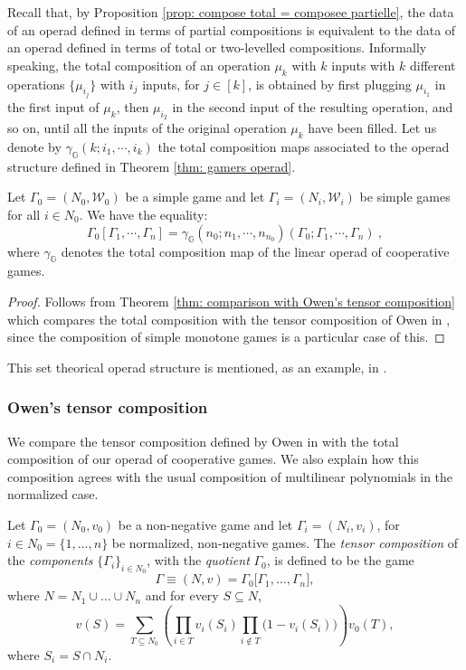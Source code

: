 \documentclass[a4paper,12pt]{amsart}
\begin{document}
\medskip

Recall that, by Proposition \ref{prop: compose total = composee partielle}, the data of an operad defined in terms of partial compositions is equivalent to the data of an operad defined in terms of total or two-levelled compositions. Informally speaking, the total composition of an operation $\mu_k$ with $k$ inputs with $k$ different operations $\{\mu_{i_j}\}$ with $i_j$ inputs, for $j \in [k]$, is obtained by first plugging $\mu_{i_1}$ in the first input of $\mu_k$, then $\mu_{i_2}$ in the second input of the resulting operation, and so on, until all the inputs of the original operation $\mu_k$ have been filled. Let us denote by $\gamma_{\mathbb{G}}(k;i_1,\cdots,i_k)$ the total composition maps associated to the operad structure defined in Theorem \ref{thm: gamers operad}. 

\begin{proposition}
Let $\Gamma_0 = (N_0, \mathcal{W}_0)$ be a simple game and let $\Gamma_i = (N_i, \mathcal{W}_i)$ be simple games for all \(i \in N_0\). We have the equality:
\[
\Gamma_0[\Gamma_1, \cdots, \Gamma_n] = \gamma_{\mathbb{G}}(n_0;n_1,\cdots,n_{n_0})(\Gamma_0;\Gamma_1,\cdots,\Gamma_n)~,
\]
where $\gamma_{\mathbb{G}}$ denotes the total composition map of the linear operad of cooperative games. 
\end{proposition}

\begin{proof}
Follows from Theorem \ref{thm: comparison with Owen's tensor composition} which compares the total composition with the tensor composition of Owen in \cite[pp. 308-309]{OwenTensor}, since the composition of simple monotone games is a particular case of this. 
\end{proof}

\begin{remark}
This set theorical operad structure is mentioned, as an example, in \cite[Section 4.4.2]{Mendez15}. 
\end{remark}

\subsubsection{Owen's tensor composition} We compare the tensor composition defined by Owen in \cite{OwenTensor} with the total composition of our operad of cooperative games. We also explain how this composition agrees with the usual composition of multilinear polynomials in the normalized case. 

\begin{definition}\label{def: tensor composition}
Let $\Gamma_0 = (N_0, v_0)$ be a non-negative game and let $\Gamma_i = (N_i, v_i)$, for $i \in N_0 = \{1, \ldots, n\}$ be normalized, non-negative games. The \emph{tensor composition} of the \emph{components} $\{\Gamma_i\}_{i \in N_0}$, with the \emph{quotient} $\Gamma_0$, is defined to be the game
\[
\Gamma \equiv (N, v) = \Gamma_0 \big[\Gamma_1, \ldots, \Gamma_n],
\]
where $N = N_1 \cup \ldots \cup N_n$ and for every $S \subseteq N$,
\[
v(S) = \sum_{T \subseteq N_0} \left( \prod_{i \in T} v_i(S_i) \prod_{i \not \in T} \big( 1 - v_i(S_i) \big) \right) v_0(T),
\]
where $S_i = S \cap N_i$. 
\end{definition}
\end{document}
